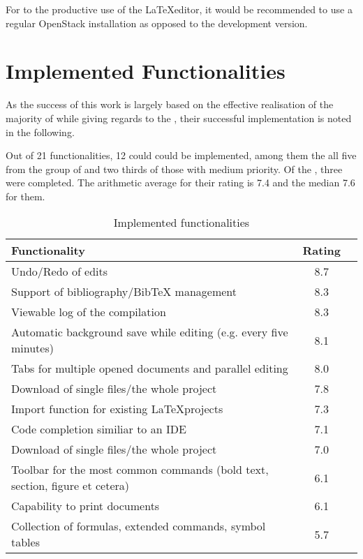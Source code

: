 For to the productive use of the \LaTeX editor, it would be recommended to use a regular OpenStack installation as opposed to the development version.

\section{Implemented Functionalities}
\label{sec:implemented-functionalities}
As the success of this work is largely based on the effective realisation of the majority of  while giving regards to the , their successful implementation is noted in the following.

Out of 21 functionalities, 12 could could be implemented, among them the all five from the group of  and two thirds of those with medium priority. Of the , three were completed. The arithmetic average for their rating is 7.4 and the median 7.6 for them.

\begin{table}[H] %
	\begin{center}
		\footnotesize
		\setlength\extrarowheight{5pt}
		\begin{tabular}{ p{11cm} cp{1.5cm} }
		  	\textbf{Functionality} 	  														& \textbf{Rating} \\
			\hline
			Undo/Redo of edits																& 8.7 \\
			Support of bibliography/BibTeX management										& 8.3 \\
			Viewable log of the compilation													& 8.3 \\
			Automatic background save while editing (e.g. every five minutes)				& 8.1 \\
			Tabs for multiple opened documents and parallel editing							& 8.0 \\
			\hline
			Download of single files/the whole project										& 7.8 \\
			Import function for existing \LaTeX projects									& 7.3 \\
			Code completion similiar to an IDE												& 7.1 \\
			Download of single files/the whole project										& 7.0 \\
			\hline
			Toolbar for the most common commands (bold text, section, figure et cetera)		& 6.1 \\
 			Capability to print documents													& 6.1 \\
			Collection of formulas, extended commands, symbol tables						& 5.7 \\
		\end{tabular}
		\caption{Implemented functionalities}
	\end{center}
\end{table}

